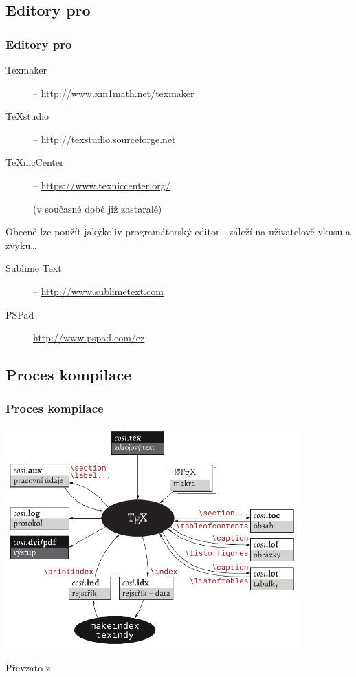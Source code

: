 \subsection{Editory pro }
\begin{frame}
	\frametitle{Editory pro }
	\begin{description}
		\item[Texmaker] -- \url{http://www.xm1math.net/texmaker}
		\item[TeXstudio] -- \url{http://texstudio.sourceforge.net}
		\item[TeXnicCenter] -- \url{https://www.texniccenter.org/}\par{}(v současné době již zastaralé)
	\end{description}
	\par
	Obecně lze použít jakýkoliv programátorský editor - záleží na uživatelově vkusu a zvyku\ldots
	\begin{description}
		\item[Sublime Text] -- \url{http://www.sublimetext.com}
		\item[PSPad]\url{http://www.pspad.com/cz}
	\end{description}
\end{frame}


\subsection{Proces kompilace}
\begin{frame}
	\frametitle{Proces kompilace}
	\begin{center}
		\includegraphics[width=0.85\textwidth]{Lecture1/Figures/CompilationProcess.pdf}
	\end{center}
	{\small{}Převzato z \cite{Satrapa2023}}
\end{frame}


